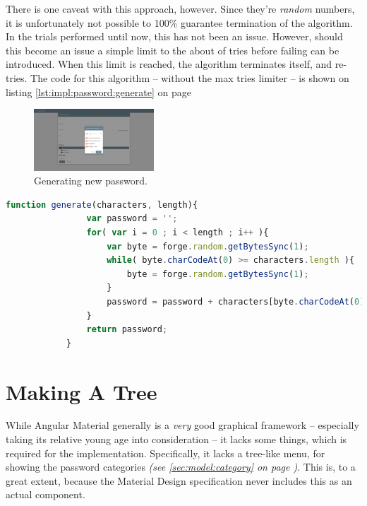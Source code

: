 		There is one caveat with this approach, however. Since they're \emph{random} numbers, it is unfortunately not possible to 100\% guarantee termination of the algorithm. In the trials performed until now, this has not been an issue. However, should this become an issue a simple limit to the about of tries before failing can be introduced. When this limit is reached, the algorithm terminates itself, and re-tries. The code for this algorithm -- without the max tries limiter -- is shown on listing \ref{lst:impl:password:generate} on page \pageref{lst:impl:password:generate}


		\begin{figure}[p]
			\centering
			\includegraphics[width=0.4\textwidth,clip,trim=750 250 750 250]{figures/implementation/screenshots/add-password.png}
			\caption{Generating new password.}
			\label{fig:impl:password:generate}
		\end{figure}

		\begin{lstlisting}[language=Javascript,gobble=12,caption={Generating the password, using the value cut-off method},label={lst:impl:password:generate}]
            function generate(characters, length){
                var password = '';
                for( var i = 0 ; i < length ; i++ ){
                    var byte = forge.random.getBytesSync(1);
                    while( byte.charCodeAt(0) >= characters.length ){
                        byte = forge.random.getBytesSync(1);					
                    }
                    password = password + characters[byte.charCodeAt(0)];
                } 
                return password;
            }	
		\end{lstlisting}


	\section{Making A Tree}
		While Angular Material generally is a \emph{very} good graphical framework -- especially taking its relative young age into consideration -- it lacks some things, which is required for the implementation. Specifically, it lacks a tree-like menu, for showing the password categories \emph{(see \ref{sec:model:category} on page \pageref{sec:model:category})}. This is, to a great extent, because the Material Design specification never includes this as an actual component. 

